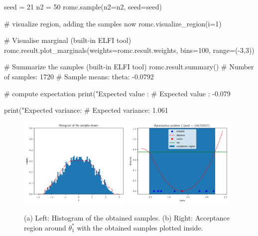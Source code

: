 \begin{pythoncode}
  seed = 21
  n2 = 50
  romc.sample(n2=n2, seed=seed)

  # visualize region, adding the samples now
  romc.visualize_region(i=1)

  # Visualise marginal (built-in ELFI tool)
  romc.result.plot_marginals(weights=romc.result.weights, bins=100, range=(-3,3))

  # Summarize the samples (built-in ELFI tool)
  romc.result.summary()
  # Number of samples: 1720
  # Sample means: theta: -0.0792

  # compute expectation
  print("Expected value   : %
  # Expected value   : -0.079

  print("Expected variance: %
  # Expected variance: 1.061
\end{pythoncode}

\begin{figure}[h]
    \begin{center}
      \includegraphics[width=0.48\textwidth]{./Thesis/images/chapter3/example_marginal.png}
      \includegraphics[width=0.48\textwidth]{./Thesis/images/chapter3/example_region_samples.png}
    \end{center}
  \caption[Histogram of the obtained samples at the 1D example.]{(a) Left: Histogram of the obtained samples. (b) Right: Acceptance region around $\theta_1^*$ with the obtained samples plotted inside.}
  \label{fig:example_sampling}
\end{figure}


